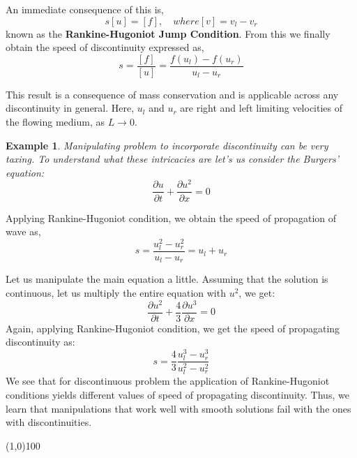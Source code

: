 \documentclass[11pt, a4paper]{report}
\newtheorem{example}{Example}[chapter] %
\begin{document}
An immediate consequence of this is,
\begin{equation*}
    s[u] = [f], \quad where [v] = v_{l} - v_{r}
\end{equation*}
known as the {\bfseries Rankine-Hugoniot Jump Condition}. From this we finally obtain the speed of discontinuity
expressed as,
\begin{equation} \label{Rankine-Hugoniot}
    s = \frac{[f]}{[u]} = \frac{f\left(u_{l}\right) - f\left(u_{r}\right)}{u_{l} - u_{r}}
\end{equation}

This result is a consequence of mass conservation and is applicable across any discontinuity in general. Here, $u_l$
and $u_r$ are right and left limiting velocities of the flowing medium, as $L\rightarrow 0$.

\begin{example}
    \normalfont Manipulating problem to incorporate discontinuity can be very taxing. To understand what these 
    intricacies are let's us consider the Burgers' equation:
    \begin{equation*}
        \frac{\partial u}{\partial t} + \frac{\partial u^{2}}{\partial x} = 0
    \end{equation*}
\end{example}
Applying Rankine-Hugoniot condition, we obtain the speed of propagation of wave as,
\begin{equation*}
    s = \frac{u_{l}^{2} - u_{r}^{2}}{u_{l} - u_{r}} = u_{l} + u_{r}
\end{equation*}

Let us manipulate the main equation a little. Assuming that the solution is continuous, let us multiply the entire
equation with $u^2$, we get:
\begin{equation*}
    \frac {\partial u^{2}}{\partial t} + \frac{4}{3}\frac{\partial u^{3}}{\partial x} = 0
\end{equation*}
Again, applying Rankine-Hugoniot condition, we get the speed of propagating discontinuity as:
\begin{equation*}
    s = \frac{4}{3}\frac{u_{l}^{3} - u_{r}^{3}}{u_{l}^{2} - u_{r}^{2}}
\end{equation*}
We see that for discontinuous problem the application of Rankine-Hugoniot conditions yields different values of 
speed of propagating discontinuity. Thus, we learn that manipulations that work well with smooth solutions fail 
with the ones with discontinuities.

\begin{center}
    \line(1,0){100}
\end{center}
\end{document}
